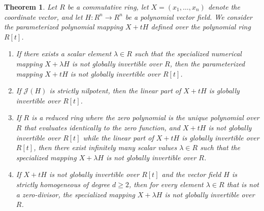 \documentclass[11pt,a4paper]{article}
\newtheorem{theorem}{Theorem}[section]
\begin{document}
\begin{theorem}
\label{thm:invertibility_specialization}
Let $R$ be a commutative ring, let $X = (x_1, \dots, x_n)$ denote the coordinate vector, and let $H: R^n \to R^n$ be a polynomial vector field. We consider the parameterized polynomial mapping $X + tH$ defined over the polynomial ring $R[t]$.
\begin{enumerate}

    \item If there exists a scalar element $\lambda \in R$ such that the specialized numerical mapping $X + \lambda H$ is not globally invertible over $R$, then the parameterized mapping $X + tH$ is not globally invertible over $R[t]$.
    
    \item If $\mathcal{J}(H)$ is strictly nilpotent, then the linear part of $X + tH$ is globally invertible over $R[t]$.
    
    \item If $R$ is a reduced ring where the zero polynomial is the unique polynomial over $R$ that evaluates identically to the zero function, and $X + tH$ is not globally invertible over $R[t]$ while the linear part of $X + tH$ is globally invertible over $R[t]$, then there exist infinitely many scalar values $\lambda \in R$ such that the specialized mapping $X + \lambda H$ is not globally invertible over $R$.
    
    \item If $X + tH$ is not globally invertible over $R[t]$ and the vector field $H$ is strictly homogeneous of degree $d \ge 2$, then for every element $\lambda \in R$ that is not a zero-divisor, the specialized mapping $X + \lambda H$ is not globally invertible over $R$.
    
\end{enumerate}
\end{theorem}
\end{document}
